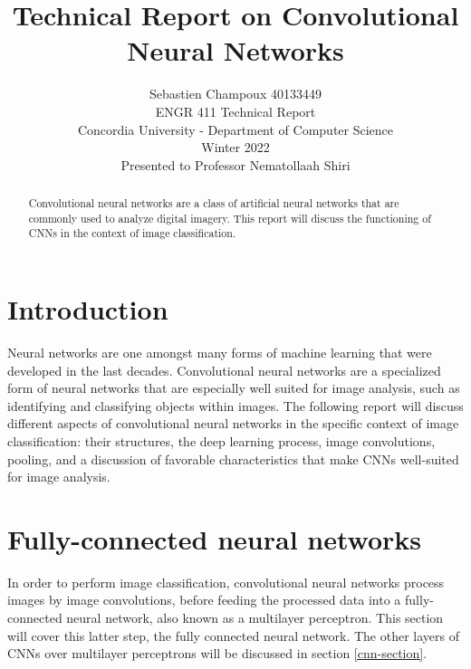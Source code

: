 \documentclass[12pt,a4paper,notitlepage]{article}
\begin{document}
\title{Technical Report on Convolutional Neural Networks}
\author{Sebastien Champoux 40133449
\\ ENGR 411 Technical Report
\\ Concordia University - Department of Computer Science
\\ Winter 2022
\\ Presented to Professor Nematollaah Shiri
}
\maketitle

\begin{abstract}
Convolutional neural networks are a class of artificial neural networks that are commonly used to analyze digital imagery. This report will discuss the functioning of CNNs in the context of image classification.
\end{abstract}
\clearpage

\tableofcontents
\clearpage

\listoffigures
\clearpage

\section{Introduction}
Neural networks are one amongst many forms of machine learning that were developed in the last decades. Convolutional neural networks are a specialized form of neural networks that are especially well suited for image analysis, such as identifying and classifying objects within images. The following report will discuss different aspects of convolutional neural networks  in the specific context of image classification: their structures, the deep learning process, image convolutions, pooling, and a discussion of favorable characteristics that make CNNs well-suited for image analysis.

\section{Fully-connected neural networks}\label{fully-connected-networks}
In order to perform image classification, convolutional neural networks process images by image convolutions, before feeding the processed data into a fully-connected neural network, also known as a multilayer perceptron. This section will cover this latter step, the fully connected neural network. The other layers of CNNs over multilayer perceptrons will be discussed in section \ref{cnn-section}.
\end{document}
